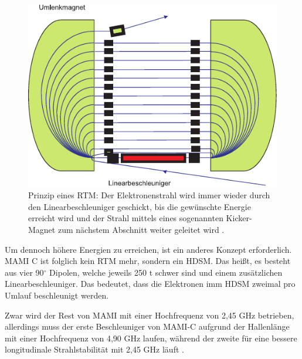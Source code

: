 \documentclass[a4paper,11pt,oneside,final,german,openbib,pdftex]{scrbook}
\begin{document}
{\begin{figure}[h!]
	\begin{center}
	\includegraphics{RTM}	
	\caption[Prinzip eines RTM]{Prinzip eines RTM: Der Elektronenstrahl wird immer wieder durch den Linearbeschleuniger geschickt, bis die gew\"unschte Energie erreicht wird und der Strahl mittels eines sogenannten Kicker-Magnet zum n\"achstem Abschnitt weiter geleitet wird \cite{KPh07}. }
	\label{fig.RTM}
\end{center}
\end{figure}

Um dennoch höhere Energien zu erreichen, ist ein anderes Konzept erforderlich. MAMI C ist folglich kein RTM mehr, sondern ein HDSM. Das hei{\ss}t, es besteht aus vier 90$^{\circ}$ Dipolen, welche jeweils 250 t schwer sind und einem zus\"atzlichen Linearbeschleuniger. 
Das bedeutet, dass die Elektronen imm HDSM zweimal pro Umlauf beschleunigt werden.

Zwar wird der Rest von MAMI mit einer Hochfrequenz von 2,45 GHz betrieben, allerdings muss der erste Beschleuniger von MAMI-C aufgrund der Hallenl\"ange mit einer Hochfrequenz von 4,90 GHz laufen, w\"ahrend der zweite f\"ur eine bessere longitudinale Strahlstabilit\"at mit 2,45 GHz l\"auft \cite{Ca10}.

\begin{table}[h!]
\centering



\end{table}}
\end{document}
